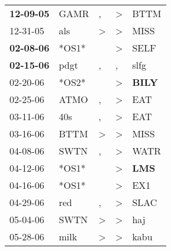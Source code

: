 \begin{supertabular}{p{0.07\textwidth}p{0.06\textwidth}p{0.02\textwidth}p{0.02\textwidth}p{0.06\textwidth}}
 \textbf{12-09-05\textsuperscript{}} &           GAMR\textsuperscript{} &                , &     \textgreater &           BTTM\textsuperscript{} \\
          12-31-05\textsuperscript{} &            als\textsuperscript{} &     \textgreater &     \textgreater &           MISS\textsuperscript{} \\
 \textbf{02-08-06\textsuperscript{}} &                            *OS1* &                  &     \textgreater &           SELF\textsuperscript{} \\
 \textbf{02-15-06\textsuperscript{}} &           pdgt\textsuperscript{} &                , &                , &           slfg\textsuperscript{} \\
          02-20-06\textsuperscript{} &                            *OS2* &                  &     \textgreater &  \textbf{BILY\textsuperscript{}} \\
          02-25-06\textsuperscript{} &           ATMO\textsuperscript{} &                , &     \textgreater &            EAT\textsuperscript{} \\
          03-11-06\textsuperscript{} &            40s\textsuperscript{} &                , &     \textgreater &            EAT\textsuperscript{} \\
          03-16-06\textsuperscript{} &           BTTM\textsuperscript{} &     \textgreater &     \textgreater &           MISS\textsuperscript{} \\
          04-08-06\textsuperscript{} &           SWTN\textsuperscript{} &                , &     \textgreater &           WATR\textsuperscript{} \\
          04-12-06\textsuperscript{} &                            *OS1* &                  &     \textgreater &   \textbf{LMS\textsuperscript{}} \\
          04-16-06\textsuperscript{} &                            *OS1* &                  &     \textgreater &            EX1\textsuperscript{} \\
          04-29-06\textsuperscript{} &            red\textsuperscript{} &                , &     \textgreater &           SLAC\textsuperscript{} \\
          05-04-06\textsuperscript{} &           SWTN\textsuperscript{} &     \textgreater &     \textgreater &            haj\textsuperscript{} \\
          05-28-06\textsuperscript{} &           milk\textsuperscript{} &     \textgreater &     \textgreater &           kabu\textsuperscript{} \\

\end{supertabular}
